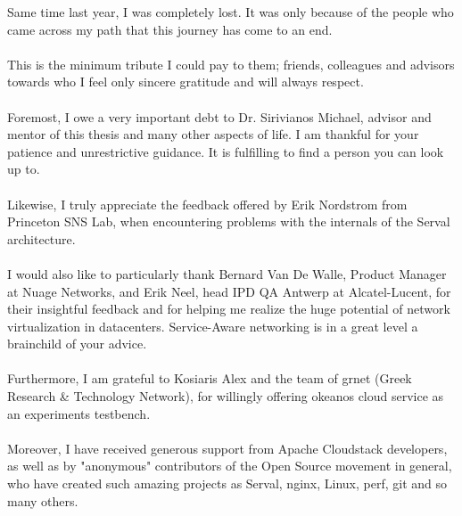 Same time last year, I was completely lost.
It was only because of the people who came across my path that this journey has come to an end.

\paragraph{}
This is the minimum tribute I could pay to them; friends, colleagues and advisors towards who I feel only sincere gratitude and will always respect.

\paragraph{}
Foremost, I owe a very important debt to Dr. Sirivianos Michael, advisor and mentor of this thesis and many other aspects of life.
I am thankful for your patience and unrestrictive guidance.
It is fulfilling to find a person you can look up to.

\paragraph{}
Likewise, I truly appreciate the feedback offered by Erik Nordstrom from Princeton SNS Lab, when encountering problems with the internals of the Serval architecture.

\paragraph{}
I would also like to particularly thank Bernard Van De Walle, Product Manager at Nuage Networks, and Erik Neel, head IPD QA Antwerp at Alcatel-Lucent, for their insightful feedback and for helping me realize the huge potential of network virtualization in datacenters.
Service-Aware networking is in a great level a brainchild of your advice.

\paragraph{}
Furthermore, I am grateful to Kosiaris Alex and the team of grnet (Greek Research \& Technology Network), for willingly offering okeanos cloud service as an experiments testbench.

\paragraph{}
Moreover, I have received generous support from Apache Cloudstack developers, as well as by "anonymous" contributors of the Open Source movement in general, who have created such amazing projects as Serval, nginx, Linux, perf, git and so many others.

